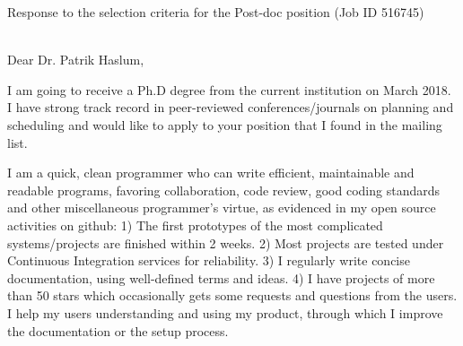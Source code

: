 \documentclass[12pt]{letter}
\begin{document}
{
\large
Response to the selection criteria for the Post-doc position (Job ID 516745)\\
\\
}

Dear Dr. Patrik Haslum,

\vspace{1em}

\setlength{\parskip}{0.2em}




I am going to receive a Ph.D degree from the current institution on March 2018.
I have strong track record in peer-reviewed conferences/journals on planning and scheduling
and would like to apply to your position that I found in the mailing list.

I am a quick, clean programmer who can write efficient, maintainable and readable programs,
favoring collaboration, code review, good coding standards and other miscellaneous programmer's virtue,
as evidenced in my open source activities on github:
1) The first prototypes of the most complicated systems/projects are finished within 2 weeks.
2) Most projects are tested under Continuous Integration services for reliability.
3) I regularly write concise documentation, using well-defined terms and ideas.
4) I have projects of more than 50 stars which occasionally gets some requests and questions from the users.
 I help my users understanding and using my product, through which I improve the documentation or the setup process.
\end{document}

